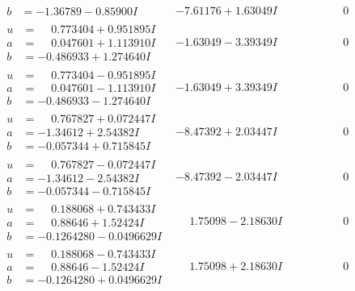 \documentclass[1p]{elsarticle_modified}
\theoremstyle{definition}
\begin{document}
$$\begin{array}{c|c|c}
\begin{aligned}
b &= -1.36789 - 0.85900 I\end{aligned}
 & -7.61176 + 1.63049 I & \phantom{-0.000000 } 0 \\ \hline\begin{aligned}
u &= \phantom{-}0.773404 + 0.951895 I \\
a &= \phantom{-}0.047601 + 1.113910 I \\
b &= -0.486933 + 1.274640 I\end{aligned}
 & -1.63049 - 3.39349 I & \phantom{-0.000000 } 0 \\ \hline\begin{aligned}
u &= \phantom{-}0.773404 - 0.951895 I \\
a &= \phantom{-}0.047601 - 1.113910 I \\
b &= -0.486933 - 1.274640 I\end{aligned}
 & -1.63049 + 3.39349 I & \phantom{-0.000000 } 0 \\ \hline\begin{aligned}
u &= \phantom{-}0.767827 + 0.072447 I \\
a &= -1.34612 + 2.54382 I \\
b &= -0.057344 + 0.715845 I\end{aligned}
 & -8.47392 + 2.03447 I & \phantom{-0.000000 } 0 \\ \hline\begin{aligned}
u &= \phantom{-}0.767827 - 0.072447 I \\
a &= -1.34612 - 2.54382 I \\
b &= -0.057344 - 0.715845 I\end{aligned}
 & -8.47392 - 2.03447 I & \phantom{-0.000000 } 0 \\ \hline\begin{aligned}
u &= \phantom{-}0.188068 + 0.743433 I \\
a &= \phantom{-}0.88646 + 1.52424 I \\
b &= -0.1264280 - 0.0496629 I\end{aligned}
 & \phantom{-}1.75098 - 2.18630 I & \phantom{-0.000000 } 0 \\ \hline\begin{aligned}
u &= \phantom{-}0.188068 - 0.743433 I \\
a &= \phantom{-}0.88646 - 1.52424 I \\
b &= -0.1264280 + 0.0496629 I\end{aligned}
 & \phantom{-}1.75098 + 2.18630 I & \phantom{-0.000000 } 0 \\ \hline\begin{aligned}

\end{aligned}
\end{array}$$
\end{document}
